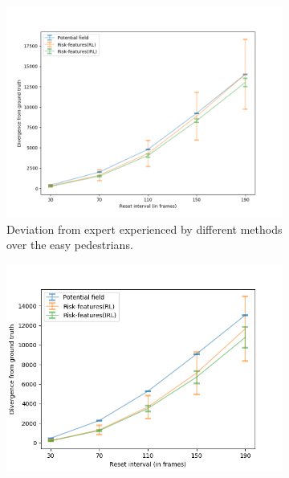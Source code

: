 %
\begin{figure}[htbp]
	\begin{subfigure}{0.5\textwidth}
		\centering
		\includegraphics[width=\linewidth]{plots/plot_without_outliers/ucy_inter_method_no_outlier/drift_analysis_easy_no_outliers.png}
		\caption{Deviation from expert experienced by different methods over the easy pedestrians.}
		\label{fig:inter_method-drift_analysis_easy}
	\end{subfigure}
	\begin{subfigure}{0.5\textwidth}
		\centering
		\includegraphics[width=\linewidth]{plots/plot_without_outliers/ucy_inter_method_no_outlier/drift_analysis_med_no_outliers.png}

\end{subfigure}
\end{figure}
